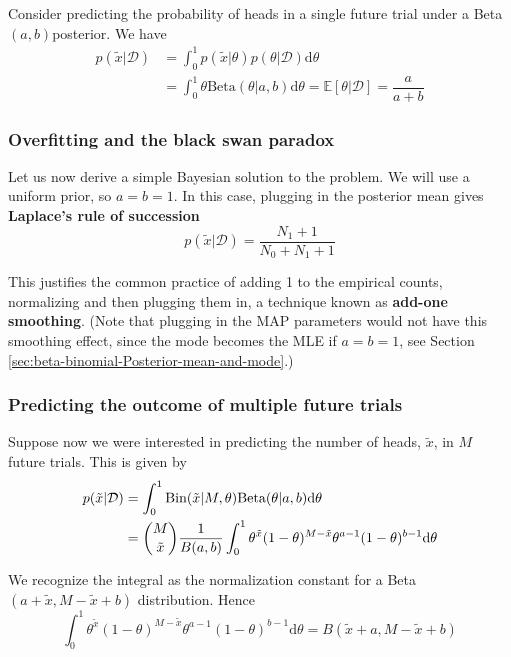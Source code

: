 Consider predicting the probability of heads in a single future trial under a Beta$(a, b)$posterior. We have
\begin{align}
p(\tilde{x}|\mathcal{D})& =\int_0^1 p(\tilde{x}|\theta)p(\theta|\mathcal{D})\mathrm{d}\theta \\
                        & =\int_0^1 \theta\text{Beta}(\theta|a,b)\mathrm{d}\theta=\mathbb{E}[\theta|\mathcal{D}]=\dfrac{a}{a+b}
\end{align}

\subsubsection{Overfitting and the black swan paradox}
Let us now derive a simple Bayesian solution to the problem. We will use a uniform prior, so $a=b=1$. In this case, plugging in the posterior mean gives \textbf{Laplace’s rule of succession}
\begin{equation}
p(\tilde{x}|\mathcal{D})=\dfrac{N_1+1}{N_0+N_1+1}
\end{equation}

This justifies the common practice of adding 1 to the empirical counts, normalizing and then plugging them in, a technique known as \textbf{add-one smoothing}. (Note that plugging in the MAP parameters would not have this smoothing effect, since the mode becomes the MLE if $a=b=1$, see Section \ref{sec:beta-binomial-Posterior-mean-and-mode}.)

\subsubsection{Predicting the outcome of multiple future trials}
Suppose now we were interested in predicting the number of heads, $\tilde{x}$, in $M$ future trials. This is given by
\begin{align}
p(\tilde{x}|\mathcal{D})& =\int_0^1 \text{Bin}(\tilde{x}|M,\theta)\text{Beta}(\theta|a,b)\mathrm{d}\theta \\
                        & =\dbinom{M}{\tilde{x}}\dfrac{1}{B(a,b)}\int_0^1 \theta^{\tilde{x}}(1-\theta)^{M-\tilde{x}}\theta^{a-1}(1-\theta)^{b-1}\mathrm{d}\theta
\end{align}

We recognize the integral as the normalization constant for a Beta$(a+\tilde{x}, M−\tilde{x}+b)$ distribution. Hence
\begin{equation}
\int_0^1 \theta^{\tilde{x}}(1-\theta)^{M-\tilde{x}}\theta^{a-1}(1-\theta)^{b-1}\mathrm{d}\theta=B(\tilde{x}+a,M-\tilde{x}+b)
\end{equation}

